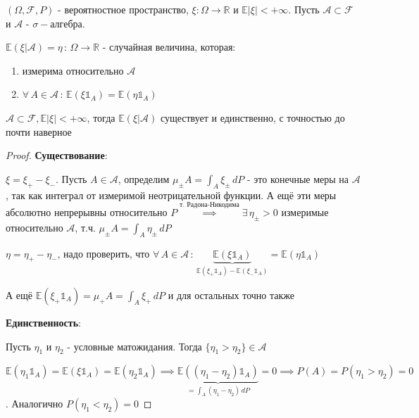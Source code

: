 
\begin{definition}
    $(\Omega, \mathcal{F}, P)$ - вероятностное пространство, $\xi : \Omega \to \mathbb{R}$ и $\mathbb{E} |\xi| < +\infty$. Пусть $\mathcal{A} \subset \mathcal{F}$ и $\mathcal{A}$ - $\sigma-$алгебра.

    $\mathbb{E} (\xi | \mathcal{A}) = \eta \, : \, \Omega \to \mathbb{R}$ - случайная величина, которая:

    \begin{enumerate}
        \item измерима относительно $\mathcal{A}$
        \item $\forall \, A \in \mathcal{A} \, : \, \mathbb{E} (\xi \mathds{1}_A) = \mathbb{E} (\eta \mathds{1}_A)$
    \end{enumerate}
\end{definition}

\begin{theorem}
    $\mathcal{A} \subset \mathcal{F}, \mathbb{E} |\xi| < +\infty$, тогда $\mathbb{E} (\xi | \mathcal{A})$ существует и единственно, с точностью до почти наверное
\end{theorem}

\begin{proof}
    \textbf{Существование}:

    $\xi = \xi_+ - \xi_-$. Пусть $A \in \mathcal{A}$, определим $\mu_{\pm} A = \int_A \xi_{\pm} \, dP$ - это конечные меры на $\mathcal{A}$, так как интеграл от измеримой неотрицательной функции.
    А ещё эти меры абсолютно непрерывны относительно $P \overset{\text{т. Радона-Никодима}}{\implies} \exists \, \eta_{\pm} > 0$ измеримые относительно $\mathcal{A}$, т.ч. $\mu_{\pm} A = \int_A \eta_{\pm} \, dP$
    
    $\eta = \eta_+ - \eta_-$, надо проверить, что $\forall \, A \in \mathcal{A} \, : \, \underbrace{\mathbb{E} (\xi \mathds{1}_A)}_{\mathbb{E}(\xi_+ \mathds{1}_A) - \mathbb{E}(\xi_- \mathds{1}_A)} = \mathbb{E} (\eta \mathds{1}_A)$

    А ещё $\mathbb{E}(\xi_+ \mathds{1}_A) = \mu_+ A = \int_A \xi_+ \, dP$ и для остальных точно также

    \textbf{Единственность}:

    Пусть $\eta_1$ и $\eta_2$ - условные матожидания. Тогда $\{ \eta_1 > \eta_2 \} \in \mathcal{A}$

    $\mathbb{E} (\eta_1 \mathds{1}_A) = \mathbb{E} (\xi \mathds{1}_A) = \mathbb{E} (\eta_2 \mathds{1}_A) \implies \underbrace{\mathbb{E} ((\eta_1 - \eta_2) \mathds{1}_A)}_{=\int_A (\eta_1 - \eta_2) \, dP} = 0 \implies P(A) = P(\eta_1 > \eta_2) = 0$. Аналогично $P(\eta_1 < \eta_2) = 0$
\end{proof}

